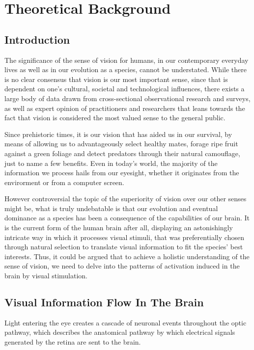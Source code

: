 \pagebreak
{}
\chapter{Theoretical Background}

\section{Introduction}

The significance of the sense of vision for humans, in our contemporary everyday lives as well as in our evolution as a species, cannot be understated. While there is no clear consensus that vision is our most important sense, since that is dependent on one's cultural, societal and technological influences, there exists a large body of data drawn from cross-sectional observational research and surveys, as well as expert opinion of practitioners and researchers that leans towards the fact that vision is considered the most valued sense to the general public.

Since prehistoric times, it is our vision that has aided us in our survival, by means of allowing us to advantageously select healthy mates, forage ripe fruit against a green foliage and detect predators through their natural camouflage, just to name a few benefits. Even in today's world, the majority of the information we process hails from our eyesight, whether it originates from the envirorment or from a computer screen.

However controversial the topic of the superiority of vision over our other senses might be, what is truly undebatable is that our evolution and eventual dominance as a species has been a consequence of the capabilities of our brain. It is the current form of the human brain after all, displaying an astonishingly intricate way in which it processes visual stimuli, that was preferentially chosen through natural selection to translate visual information to fit the species' best interests. Thus, it could be argued that to achieve a holistic understanding of the sense of vision, we need to delve into the patterns of activation induced in the brain by visual stimulation.

\section{Visual Information Flow In The Brain}

Light entering the eye creates a cascade of neuronal events throughout the optic pathway, which describes the anatomical pathway by which electrical signals generated by the retina are sent to the brain.

